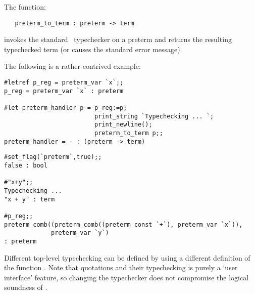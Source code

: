 The function:

\begin{boxed}
\begin{verbatim}
   preterm_to_term : preterm -> term
\end{verbatim}\end{boxed}

\noindent invokes the standard \HOL\ typechecker on a preterm and returns the
resulting typechecked term (or causes the standard error message).



The following is a rather contrived example:

\setcounter{sessioncount}{1}
\begin{session}
\begin{verbatim}
#letref p_reg = preterm_var `x`;;
p_reg = preterm_var `x` : preterm

#let preterm_handler p = p_reg:=p;
                         print_string `Typechecking ... `;
                         print_newline();
                         preterm_to_term p;;
preterm_handler = - : (preterm -> term)
\end{verbatim}\end{session}

\begin{session}
\begin{verbatim}
#set_flag(`preterm`,true);;
false : bool

#"x+y";;
Typechecking ...
"x + y" : term

#p_reg;;
preterm_comb((preterm_comb((preterm_const `+`), preterm_var `x`)),
             preterm_var `y`)
: preterm
\end{verbatim}\end{session}

\noindent Different top-level typechecking can be defined by using a
different definition of the function
. Note that quotations and their typechecking
is purely a `user interface' feature, so changing the typechecker does
not compromise the logical soundness of \HOL.



